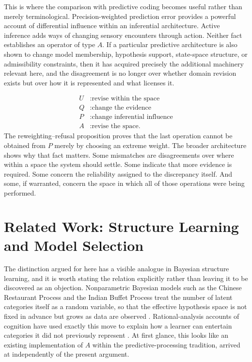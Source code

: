 \documentclass[11pt]{article}
\begin{document}
This is where the comparison with predictive coding becomes useful rather than merely terminological. Precision-weighted prediction error provides a powerful account of differential influence within an inferential architecture. Active inference adds ways of changing sensory encounters through action. Neither fact establishes an operator of type $A$. If a particular predictive architecture is also shown to change model membership, hypothesis support, state-space structure, or admissibility constraints, then it has acquired precisely the additional machinery relevant here, and the disagreement is no longer over whether domain revision exists but over how it is represented and what licenses it.

\[
\boxed{
\begin{aligned}
U &: \text{revise within the space} \\
Q &: \text{change the evidence} \\
P &: \text{change inferential influence} \\
A &: \text{revise the space.}
\end{aligned}}
\]
The reweighting–refusal proposition proves that the last operation cannot be obtained from $P$ merely by choosing an extreme weight. The broader architecture shows why that fact matters. Some mismatches are disagreements over where within a space the system should settle. Some indicate that more evidence is required. Some concern the reliability assigned to the discrepancy itself. And some, if warranted, concern the space in which all of those operations were being performed.

\begin{center}
\end{center}

\section{Related Work: Structure Learning and Model Selection}

The distinction argued for here has a visible analogue in Bayesian structure learning, and it is worth stating the relation explicitly rather than leaving it to be discovered as an objection. Nonparametric Bayesian models such as the Chinese Restaurant Process and the Indian Buffet Process treat the number of latent categories itself as a random variable, so that the effective hypothesis space is not fixed in advance but grows as data are observed \citep{aldous1985,griffiths2011}. Rational-analysis accounts of cognition have used exactly this move to explain how a learner can entertain categories it did not previously represent \citep{andersonrational1991,tenenbaum2011}. At first glance, this looks like an existing implementation of $A$ within the predictive-processing tradition, arrived at independently of the present argument.
\end{document}
